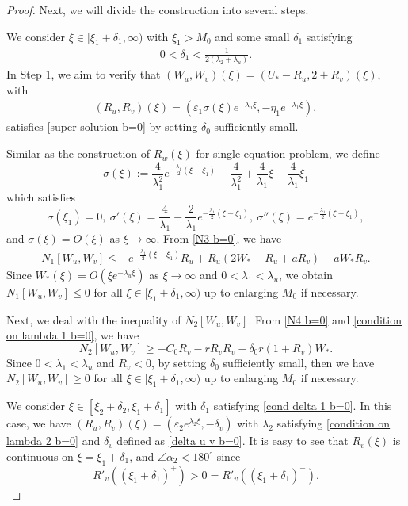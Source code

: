 \documentclass[11pt,a4paper]{article}
\numberwithin{equation}{section}
\numberwithin{figure}{section}
\newcommand\bea{\begin{eqnarray}}
\newcommand\eea{\end{eqnarray}}
\newcommand\beaa{\begin{eqnarray*}}
\newcommand\eeaa{\end{eqnarray*}}
\begin{document}
\begin{proof}
Next, we will divide the construction into several steps.

 We consider $\xi\in[\xi_{1}+\delta_1,\infty)$ with $\xi_1>M_0$ and some small $\delta_1$ satisfying
\bea\label{cond delta 1 b=0}
0<\delta_1<\frac{1}{2(\lambda_2+\lambda_u)}.
\eea
In Step 1, we aim to verify that $(W_u,W_v)(\xi)=(U_*-R_u,2+R_v)(\xi)$, with
\beaa
(R_u,R_v)(\xi)=(\varepsilon_1\sigma(\xi)e^{-\lambda_u\xi},-\eta_1 e^{-\lambda_1\xi}),
\eeaa
satisfies \eqref{super solution b=0} by setting  $\delta_0$ sufficiently small.

Similar as the construction of $R_w(\xi)$ for single equation problem, we define
$$\sigma(\xi):=\frac{4}{\lambda_1^2}e^{-\frac{\lambda_1}{2}(\xi-\xi_1)}-\frac{4}{\lambda_1^2}+\frac{4}{\lambda_1}\xi-\frac{4}{\lambda_1}\xi_1$$
which satisfies 
$$\sigma(\xi_1)=0,\ \sigma'(\xi)=\frac{4}{\lambda_1}-\frac{2}{\lambda_1}e^{-\frac{\lambda_1}{2}(\xi-\xi_1)},\ \sigma''(\xi)=e^{-\frac{\lambda_1}{2}(\xi-\xi_1)},$$ 
and $\sigma(\xi)= O(\xi)$ as $\xi\to\infty$.
From \eqref{N3 b=0}, we have
\beaa
N_1[W_u,W_v]\le -e^{-\frac{\lambda_1}{2}(\xi-\xi_1)}R_u+R_u(2W_*-R_u+aR_v)-aW_*R_v.
\eeaa
Since $W_*(\xi)= O(\xi e^{-\lambda_u\xi})$ as $\xi\to\infty$ and  $0<\lambda_1<\lambda_u$, we obtain $N_1[W_u,W_v]\le 0$ for all $\xi\in[\xi_1+\delta_1,\infty)$ up to enlarging $M_0$ if necessary.


Next, we deal with the inequality of $N_2[W_u, W_v]$.
From \eqref{N4 b=0} and \eqref{condition on lambda 1 b=0}, we have
\begin{equation*}
N_2[W_u,W_v]\ge -C_0R_v-rR_vR_v-\delta_0r(1+R_v)W_*.
\end{equation*}
Since $0<\lambda_1<\lambda_u$ and $R_v<0$, by setting $\delta_0$ sufficiently small, then we have $N_2[W_u,W_v]\geq0$ for all $\xi\in[\xi_1+\delta_1,\infty)$ up to enlarging $M_0$ if necessary.

\medskip

 We consider $\xi\in[\xi_{2}+\delta_2,\xi_1+\delta_1]$ with $\delta_1$ satisfying \eqref{cond delta 1 b=0}.
In this case, we have
$(R_u,R_v)(\xi)=(\varepsilon_2e^{\lambda_2\xi},-\delta_v)$
with $\lambda_2$ satisfying \eqref{condition on lambda 2 b=0} and $\delta_v$ defined as \eqref{delta u v b=0}. It is easy to see that $R_v(\xi)$ is continuous on $\xi=\xi_1+\delta_1$, and $\angle \alpha_2<180^{\circ}$ since 
$$R'_v((\xi_1+\delta_1)^+)>0=R'_v((\xi_1+\delta_1)^-).$$


\end{proof}
\end{document}
